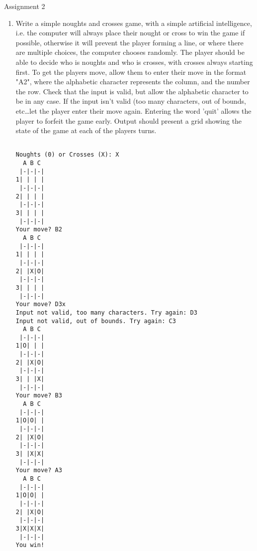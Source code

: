 \hypertarget{assignment2}{Assignment 2}
\begin{enumerate}
	\item Write a simple noughts and crosses    game, with a simple artificial intelligence, i.e. the computer    will always place their nought or cross to win the game if    possible, otherwise it will prevent the player forming a line,    or where there are multiple choices, the computer chooses    randomly.  The player should be able to decide who is noughts    and who is crosses, with crosses always starting first.  To get    the players move, allow them to enter their move in the format    "A2", where the alphabetic character represents the column, and    the number the row. Check that the input is valid, but allow    the alphabetic character to be in any case. If the input isn't    valid (too many characters, out of bounds, etc\ldots let the    player enter their move again. Entering the word 'quit' allows    the player to forfeit the game early. Output should present a    grid showing the state of the game at each of the players    turns.     
\begin{lstlisting}

Noughts (0) or Crosses (X): X
  A B C
 |-|-|-|
1| | | |
 |-|-|-|
2| | | |
 |-|-|-|
3| | | |
 |-|-|-|
Your move? B2
  A B C
 |-|-|-|
1| | | |
 |-|-|-|
2| |X|O|
 |-|-|-|
3| | | |
 |-|-|-|
Your move? D3x
Input not valid, too many characters. Try again: D3
Input not valid, out of bounds. Try again: C3
  A B C
 |-|-|-|
1|O| | |
 |-|-|-|
2| |X|O|
 |-|-|-|
3| | |X|
 |-|-|-|
Your move? B3
  A B C
 |-|-|-|
1|O|O| |
 |-|-|-|
2| |X|O|
 |-|-|-|
3| |X|X|
 |-|-|-|
Your move? A3
  A B C
 |-|-|-|
1|O|O| |
 |-|-|-|
2| |X|O|
 |-|-|-|
3|X|X|X|
 |-|-|-|
You win!
\end{lstlisting}
\end{enumerate}

